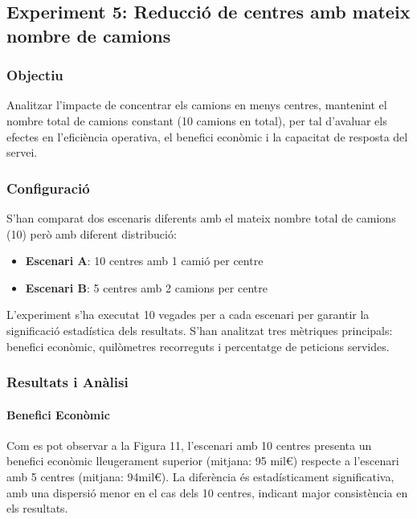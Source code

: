 \subsection{Experiment 5: Reducció de centres amb mateix nombre de camions}

\subsubsection{Objectiu}
Analitzar l'impacte de concentrar els camions en menys centres, mantenint el nombre total de camions constant (10 camions en total), per tal d'avaluar els efectes en l'eficiència operativa, el benefici econòmic i la capacitat de resposta del servei.


\subsubsection{Configuració}
S'han comparat dos escenaris diferents amb el mateix nombre total de camions (10) però amb diferent distribució:
\begin{itemize}
    \item \textbf{Escenari A}: 10 centres amb 1 camió per centre
    \item \textbf{Escenari B}: 5 centres amb 2 camions per centre
\end{itemize}

L'experiment s'ha executat 10 vegades per a cada escenari per garantir la significació estadística dels resultats. S'han analitzat tres mètriques principals: benefici econòmic, quilòmetres recorreguts i percentatge de peticions servides.

\subsubsection{Resultats i Anàlisi}

\paragraph{Benefici Econòmic}

Com es pot observar a la Figura 11, l'escenari amb 10 centres presenta un benefici econòmic lleugerament superior (mitjana: 95 mil€) respecte a l'escenari amb 5 centres (mitjana: 94mil€). La diferència és estadísticament significativa, amb una dispersió menor en el cas dels 10 centres, indicant major consistència en els resultats.


